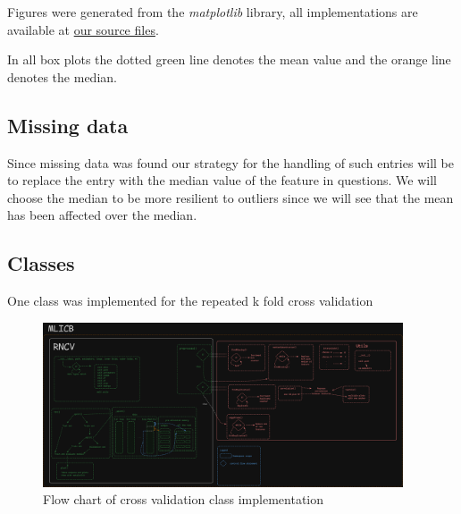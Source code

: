 \documentclass[12pt, a4paper]{article}
\begin{document}
\begin{multicols}{2}
    Figures were generated from the \textit{matplotlib} \cite{noauthor_matplotlib_nodate} library, all implementations are available at \href{https://github.com/ArisPodotas/Assignment-1-MLICB/blob/main/src/functions.py}{our source files}.
    \newline

    In all box plots the dotted green line denotes the mean value and the orange line denotes the median.
    \newline

    \subsection{Missing data} \label{subsec:missing}

    Since missing data was found our strategy for the handling of such entries will be to replace the entry with the median value of the feature in questions. We will choose the median to be more resilient to outliers since we will see that the mean has been affected over the median.
    \newline

    \subsection{Classes} \label{subsec:class}

    One class was implemented for the repeated k fold cross validation
    \newline

\end{multicols}

    \begin{figure}[H]
        \begin{center}
            \includegraphics[width=0.95\textwidth]{figures/rcv.png}
        \end{center}
        \caption{Flow chart of cross validation class implementation}\label{fig:class outline}
    \end{figure}
\end{document}
